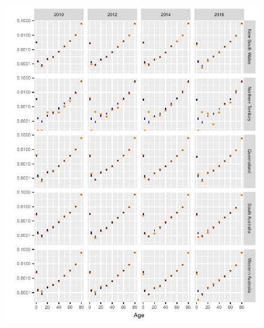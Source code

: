 \documentclass{article}
\begin{document}
\begin{figure}
  \centering
  \includegraphics{out/fig_rates_modelled_Female_Non-Indigenous_Baseline}
\end{figure}
\newpage
\end{document}
